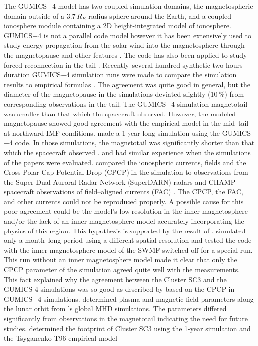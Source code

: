 \documentclass[draft]{agujournal2019}
\begin{document}
The GUMICS$-$4 model has two coupled simulation domains, the magnetospheric domain outside of a 3.7\,$R_E$ radius sphere around the Earth, and a coupled ionosphere module containing a 2D height-integrated model of ionosphere. GUMICS$-$4 is not a parallel code model however it has been extensively used to study energy propagation from the solar wind into the magnetosphere through the magnetopause and other features \cite[see the references therein]{janhunen12:_gumic_mhd}. The code has also been applied to study forced reconnection in the tail \cite{voeroes14:_winds_condit_ram_co_ram}. Recently, several hundred synthetic two hours duration GUMICS$-$4 simulation runs were made to compare the simulation results to empirical formulas \cite{gordeev13:_verif_gumic_mhd}. The agreement was quite good in general, but the diameter of the magnetopause in the simulations deviated slightly (10\,\%) from corresponding observations in the tail. The GUMICS$-$4 simulation magnetotail was smaller than that which the spacecraft observed. However, the modeled magnetopause showed good agreement with the empirical model in the mid--tail at northward IMF conditions.  made a 1-year long simulation using the GUMICS$-$4 code. In those simulations, the magnetotail was significantly shorter than that which the spacecraft observed \cite{facsko16:_one_earth}.  and  had similar experience when the simulations of the papers were evaluated.  compared the ionospheric currents, fields and the Cross Polar Cap Potential Drop (CPCP) in the simulation to observations from the Super Dual Auroral Radar Network (SuperDARN) radars \cite{greenwald95:_darn_super} and CHAMP spacecraft \cite{reigber02:_champ} observations of field--aligned currents (FAC) \cite{juusola07:_hall_peder_champ,ritter04:_ionos_champ_image}. The CPCP, the FAC, and other currents could not be reproduced properly. A possible cause for this poor agreement could be the model's low resolution in the inner magnetosphere and/or the lack of an inner magnetosphere model accurately incorporating the physics of this region. This hypothesis is supported by the result of .  simulated only a month--long period using a different spatial resolution and tested the code with the inner magnetosphere model of the SWMF switched off for a special run. This run without an inner magnetosphere model made it clear that only the CPCP parameter of the simulation agreed quite well with the measurements. This fact explained why the agreement between the Cluster SC3 and the GUMICS-4 simulations was so good as described by  based on the CPCP in GUMICS$-$4 simulations.  determined plasma and magnetic field parameters along the lunar orbit from 's global MHD simulations. The parameters differed significantly from observations in the magnetotail indicating the need for future studies.  determined the footprint of Cluster SC3 using the 1-year simulation and the Tsyganenko T96 empirical model 
\end{document}

